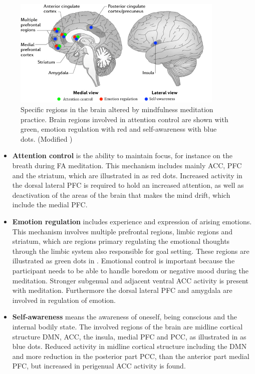 \begin{figure}[H]
	\includegraphics[width=0.9\textwidth]{figures/brain_meditation.png} 
\caption{Specific regions in the brain altered by mindfulness meditation practice. Brain regions involved in attention control are shown with green, emotion regulation with red and self-awareness with blue dots. (Modified \cite{Tang2017})}
\label{fig:brain_meditation}  
\end{figure}

  
\begin{itemize}
	\item \textbf{Attention control} is the ability to maintain focus, for instance on the breath during FA meditation. This mechanism includes mainly ACC, PFC and the striatum, which are illustrated in  as red dots. Increased activity in the dorsal lateral PFC is required to hold an increased attention, as well as deactivation of the areas of the brain that makes the mind drift, which include the medial PFC. \cite{Tang2017}
	\item \textbf{Emotion regulation} includes experience and expression of arising emotions. This mechanism involves multiple prefrontal regions, limbic regions and striatum, which are regions primary regulating the emotional thoughts through the limbic system also responsible for goal setting. These regions are illustrated as green dots in . Emotional control is important because the participant needs to be able to handle boredom or negative mood during the meditation. Stronger subgenual and adjacent ventral ACC activity is present with meditation. Furthermore the dorsal lateral PFC and amygdala are involved in regulation of emotion. \cite{Tang2017}
	\item \textbf{Self-awareness} means the awareness of oneself, being conscious and the internal bodily state. The involved regions of the brain are midline cortical structure DMN, ACC, the insula, medial PFC and PCC, as illustrated in  as blue dots. Reduced activity in midline cortical structure including the DMN and more reduction in the posterior part PCC, than the anterior part medial PFC, but increased in perigenual ACC activity is found.  \cite{Tang2017}
\end{itemize}


